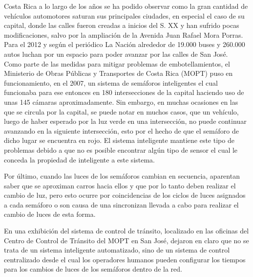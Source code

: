 \documentclass[12pt,journal,compsoc]{IEEEtran}
\begin{document}
% 
% 
% 
% 
 Costa Rica a lo largo de los a\~{n}os se ha podido observar como la gran
	cantidad de veh\'{i}culos automotores saturan sus principales ciudades, en especial
	el caso de su capital, donde las calles fueron creadas a inicios del S. XX y han sufrido pocas modificaciones, salvo por la ampliación de la Avenida Juan Rafael Mora Porras. Para el 2012 y seg\'{u}n el peri\'{o}dico La Naci\'{o}n
	alrededor de 19.000 buses y 260.000 autos luchan por un espacio para poder avanzar por las calles de San Jos\'{e}. \cite{Villegas2012}\\ 
	
Como parte de las medidas para mitigar problemas de embotellamientos, el
	Ministerio de Obras P\'{u}blicas y Transportes de Costa Rica (MOPT) puso en funcionamiento,
	en el 2007, un sistema de sem\'{a}foros inteligentes el cual funcionaba para
	ese entonces en 180 intersecciones de la capital haciendo uso de unas 145
	c\'{a}maras aproximadamente. Sin embargo, en muchas ocasiones en las que se
	circula por la capital, se puede notar en muchos
	casos, que un veh\'{i}culo, luego de haber esperado por la luz verde en una intersecci\'on,  no puede continuar  avanzando en la siguiente intersecci\'on, esto por el hecho
	de que el sem\'{a}foro de dicho lugar se encuentra en rojo. El sistema inteligente mantiene este tipo de
	problemas debido a que no es
	posible encontrar alg\'{u}n tipo de sensor el cual le conceda la propiedad de inteligente a este sistema.\cite{Loaiza2007}
		
		Por \'{u}ltimo, cuando las luces de los sem\'{a}foros cambian en secuencia, aparentan
	saber que se aproximan carros hacia ellos y que por lo tanto deben realizar el
	cambio de luz, pero esto ocurre por coincidencias de los ciclos de luces
	asignados a cada sem\'{a}foro o son causa de una sincronizan llevada a cabo para realizar el cambio de luces de esta forma.

		En una exhibici\'{o}n del sistema de control de tr\'{a}nsito, localizado en las
	oficinas del Centro de Control de Tr\'{a}nsito del MOPT en San Jos\'{e}, dejaron en claro que no se trata de un sistema inteligente automatizado,
	sino de un sistema de control centralizado desde el cual los operadores humanos pueden configurar los tiempos para los cambios de luces de los
	sem\'{a}foros dentro de la red. 
\end{document}
